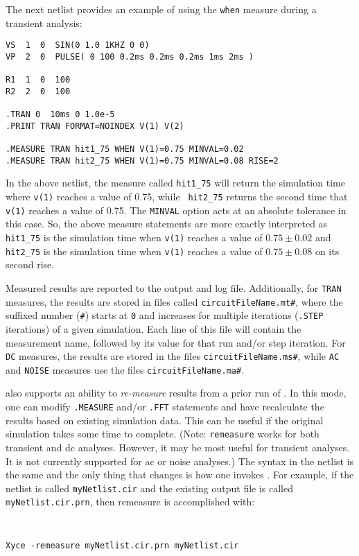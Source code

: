 {{The next netlist provides an example of using the \texttt{when} measure
during a transient analysis:

\begin{verbatim}
VS  1  0  SIN(0 1.0 1KHZ 0 0)
VP  2  0  PULSE( 0 100 0.2ms 0.2ms 0.2ms 1ms 2ms )

R1  1  0  100
R2  2  0  100

.TRAN 0  10ms 0 1.0e-5
.PRINT TRAN FORMAT=NOINDEX V(1) V(2) 

.MEASURE TRAN hit1_75 WHEN V(1)=0.75 MINVAL=0.02
.MEASURE TRAN hit2_75 WHEN V(1)=0.75 MINVAL=0.08 RISE=2

\end{verbatim}

In the above netlist, the measure called \texttt{hit1\_75} will return the
simulation time where \texttt{v(1)} reaches a value of 0.75, while {\tt
hit2\_75} returns the second time that \texttt{v(1)} reaches a value of 0.75.
The \texttt{MINVAL} option acts at an absolute tolerance in this case. So, the
above measure statements are more exactly interpreted as \texttt{hit1\_75} is
the simulation time when \texttt{v(1)} reaches a value of $0.75 \pm 0.02$ and
\texttt{hit2\_75} is the simulation time when {\tt v(1)} reaches a value of
$0.75 \pm 0.08$ on its second rise.

Measured results are reported to the output and log file.  Additionally, for \texttt{TRAN}
measures, the results are stored in files called \texttt{circuitFileName.mt\#}, where
the suffixed number (\texttt{\#}) starts at \texttt{0} and increases for multiple
iterations (\texttt{.STEP} iterations) of a given simulation. Each line of this file
will contain the measurement name, followed by its value for that run and/or step 
iteration.  For \texttt{DC} measures, the results are stored in the files
\texttt{circuitFileName.ms\#}, while \texttt{AC} and \texttt{NOISE} measures
use the files \texttt{circuitFileName.ma\#}.

\Xyce{} also supports an ability to {\it re-measure} results from a prior run of \Xyce{}.
In this mode, one can modify \texttt{.MEASURE} and/or \texttt{.FFT} statements and have
\Xyce{} recalculate  the results based on existing simulation data.  This can be useful if the
original simulation takes some time to complete.  (Note: \texttt{remeasure} works for both
transient and dc analyses.  However, it may be most useful for transient analyses.  It is
not currently supported for ac or noise analyses.)  The syntax in the netlist is the same
and the only thing that changes is how one invokes \Xyce{}.  For example, if the netlist
is called {\tt myNetlist.cir} and the existing output file is called {\tt myNetlist.cir.prn},
then remeasure is accomplished with:
{\tt
\begin{verbatim}
Xyce -remeasure myNetlist.cir.prn myNetlist.cir
\end{verbatim}
}

}}
